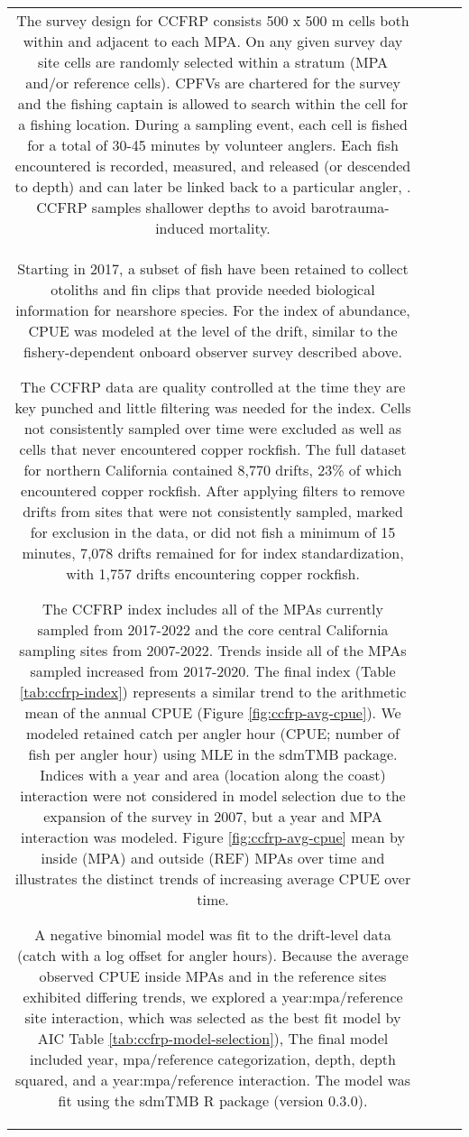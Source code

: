 \documentclass[11pt,
  letterpaper,
]{article}
\begin{document}
\begin{longtable}[t]{c>{\centering\arraybackslash}p{2cm}>{\centering\arraybackslash}p{2cm}>{\centering\arraybackslash}p{2cm}}
The survey design for CCFRP consists 500 x 500 m cells both within and adjacent to each MPA. On any given survey day site cells are randomly selected within a stratum (MPA and/or reference cells). CPFVs are chartered for the survey and the fishing captain is allowed to search within the cell for a fishing location. During a sampling event, each cell is fished for a total of 30-45 minutes by volunteer anglers. Each fish encountered is recorded, measured, and released (or descended to depth) and can later be linked back to a particular angler, . CCFRP samples shallower depths to avoid barotrauma-induced mortality.\\
Starting in 2017, a subset of fish have been retained to collect otoliths and fin clips that provide needed biological information for nearshore species. For the index of abundance, CPUE was modeled at the level of the drift, similar to the fishery-dependent onboard observer survey described above.

The CCFRP data are quality controlled at the time they are key punched and little filtering was needed for the index. Cells not consistently sampled over time were excluded as well as cells that never encountered copper rockfish. The full dataset for northern California contained 8,770 drifts, 23\% of which encountered copper rockfish. After applying filters to remove drifts from sites that were not consistently sampled, marked for exclusion in the data, or did not fish a minimum of 15 minutes, 7,078 drifts remained for for index standardization, with 1,757 drifts encountering copper rockfish.

The CCFRP index includes all of the MPAs currently sampled from 2017-2022 and the core central California sampling sites from 2007-2022. Trends inside all of the MPAs sampled increased from 2017-2020. The final index (Table \ref{tab:ccfrp-index}) represents a similar trend to the arithmetic mean of the annual CPUE (Figure \ref{fig:ccfrp-avg-cpue}). We modeled retained catch per angler hour (CPUE; number of fish per angler hour) using MLE in the sdmTMB package. Indices with a year and area (location along the coast) interaction were not considered in model selection due to the expansion of the survey in 2007, but a year and MPA interaction was modeled. Figure \ref{fig:ccfrp-avg-cpue} mean by inside (MPA) and outside (REF) MPAs over time and illustrates the distinct trends of increasing average CPUE over time.

A negative binomial model was fit to the drift-level data (catch with a log offset for angler hours). Because the average observed CPUE inside MPAs and in the reference sites exhibited differing trends, we explored a year:mpa/reference site interaction, which was selected as the best fit model by AIC Table \ref{tab:ccfrp-model-selection}), The final model included year, mpa/reference categorization, depth, depth squared, and a year:mpa/reference interaction. The model was fit using the sdmTMB R package (version 0.3.0).


\end{longtable}
\end{document}
